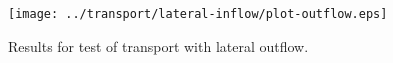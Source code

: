 \documentclass[12pt,dvips,letterpaper]{article}
\begin{document}
\begin{figure}[htbp]
  \begin{center}
    \texttt{[image: ../transport/lateral-inflow/plot-outflow.eps]}
    \caption{Results for test of transport with lateral outflow.} 
    \label{fig:test-tranport-lateral-outflow}
  \end{center}
\end{figure}


\end{document}
